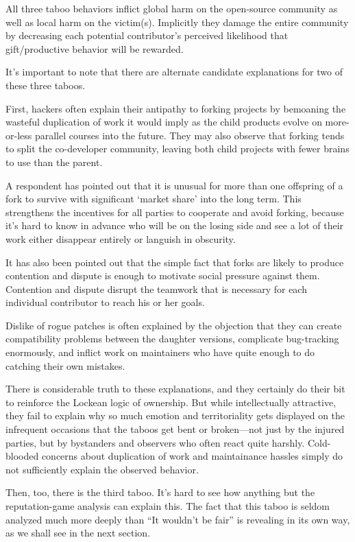 All three taboo behaviors inflict global harm on the open-source community as
well as local harm on the victim(s).  Implicitly they damage the entire
community by decreasing each potential contributor's perceived likelihood that
gift/productive behavior will be rewarded.

It's important to note that there are alternate candidate explanations for two
of these three taboos.

First, hackers often explain their antipathy to forking projects by bemoaning
the wasteful duplication of work it would imply as the child products evolve on
more-or-less parallel courses into the future.  They may also observe that
forking tends to split the co-developer community, leaving both child projects
with fewer brains to use than the parent.

A respondent has pointed out that it is unusual for more than one offspring of a
fork to survive with significant `market share' into the long term.  This
strengthens the incentives for all parties to cooperate and avoid forking,
because it's hard to know in advance who will be on the losing side and see a
lot of their work either disappear entirely or languish in obscurity.

It has also been pointed out that the simple fact that forks are likely to
produce contention and dispute is enough to motivate social pressure against
them.  Contention and dispute disrupt the teamwork that is necessary for each
individual contributor to reach his or her goals.

Dislike of rogue patches is often explained by the objection that they can
create compatibility problems between the daughter versions, complicate
bug-tracking enormously, and inflict work on maintainers who have quite enough
to do catching their own mistakes.

There is considerable truth to these explanations, and they certainly do their
bit to reinforce the Lockean logic of ownership.  But while intellectually
attractive, they fail to explain why so much emotion and territoriality gets
displayed on the infrequent occasions that the taboos get bent or broken—not
just by the injured parties, but by bystanders and observers who often react
quite harshly.  Cold-blooded concerns about duplication of work and maintainance
hassles simply do not sufficiently explain the observed behavior.

Then, too, there is the third taboo.  It's hard to see how anything but the
reputation-game analysis can explain this.  The fact that this taboo is seldom
analyzed much more deeply than ``It wouldn't be fair'' is revealing in its own
way, as we shall see in the next section.
